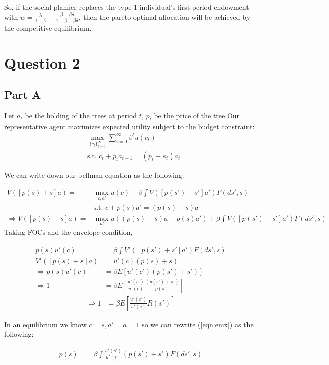 \documentclass[11pt]{article} %
\begin{document}
So, if the social planner replaces the type-1 individual's first-period endowment with $w = \frac{\lambda}{1-\beta} -  \frac{\beta - \beta\delta}{1-\beta + \beta\delta}$, then the pareto-optimal allocation will be achieved by the competitive equilibrium.

\section{Question 2}
\subsection{Part A}

Let $a_t$ be the holding of the trees at period $t$, $p_t$ be the price of the tree
Our representative agent maximizes expected utility subject to the budget constraint:
\begin{align*}
&\max_{\{c_t\}_{t=0}^{\infty}} \sum_{i=0}^{\infty} \beta^t u(c_t)\\
&\text{s.t. }c_t + p_ta_{t+1} = (p_t+s_t)a_t 
\end{align*}

We can write down our bellman equation as the following:

\begin{align*}
V([p(s)+s]a) = &\max_{c,a'} u(c) + \beta  \int V([p(s')+s']a')F(ds',s)\\
&\text{s.t. } c + p(s)a' = (p(s) + s)a\\
\Rightarrow V([p(s)+s]a) = &\max_{a'} u((p(s) +s)a -p(s)a') + \beta  \int V([p(s')+s']a')F(ds',s)
\end{align*}
Taking FOCs and the envelope condition,

\begin{align*}
p(s) u'(c) &= \beta \int V'([p(s')+s']a')F(ds',s)\\
V'([p(s)+s]a) &= u'(c)(p(s) + s ) \\
\Rightarrow p(s) u'(c)  &= \beta E[ u'(c')(p(s') + s' )]\\
\Rightarrow 1 &= \beta E\left[ \frac{u'(c')}{u'(c)} \frac{(p(s') + s' )}{p(s)}\right]
\end{align*}
\begin{align}
\Rightarrow 1 &= \beta E\left[ \frac{u'(c')}{u'(c)} R(s')\right] \label{eqn:emx}
\end{align}

In an equilibrium we know $c=s,a'=a=1$ so we can rewrite (\ref{eqn:emx}) as the following:

\begin{align}
 p(s)  &= \beta\int  \frac{u'(s')}{u'(s)}(p(s') + s' )F(ds',s) \label{eqn:emxfp}
\end{align}
\end{document}
